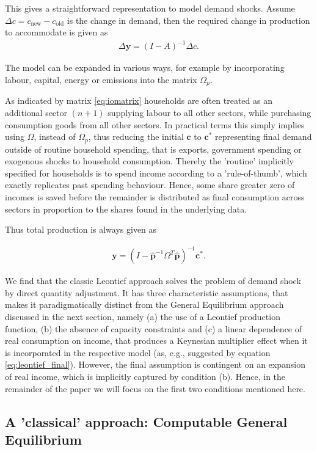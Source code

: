 \documentclass{article}
\newcommand{\hbf}[1]{\hat {\mathbf #1}}
\begin{document}
This gives a straightforward representation to model demand shocks. Assume $\Delta c = c_{\text{new}} - c_{\text{old}}$ is the change in demand, then the required change in production to accommodate is given as 
\begin{align}
   \Delta \mathbf{y} = (I - A)^{-1} \Delta c.
\end{align}

The model can be expanded in various ways, for example by incorporating labour, capital, energy or emissions into the matrix $\Omega_p$.

As indicated by matrix \eqref{eq:iomatrix} households are often treated as an additional sector $(n+1)$ supplying labour to all other sectors, while purchasing consumption goods from all other sectors. In practical terms this simply implies using $\Omega$, instead of $\Omega_p$, thus reducing the initial $\mathbf c$ to $\mathbf c^*$ representing final demand outside of routine household spending, that is exports, government spending or exogenous shocks to household consumption. Thereby the 'routine' implicitly specified for households is to spend income according to a 'rule-of-thumb', which exactly replicates past spending behaviour. Hence, some share greater zero of incomes is saved before the remainder is distributed as final consumption across sectors in proportion to the shares found in the underlying data.

Thus total production is always given as

\begin{align}\label{eq:leontief_final}
  \mathbf{y} =  (I -   \hbf{p}^{-1} \Omega^T \hbf{p})^{-1}  \mathbf c^*.
\end{align}

We find that the classic Leontief approach solves the problem of demand shock by direct quantity adjustment. It has three characteristic assumptions, that makes it paradigmatically distinct from the General Equilibrium approach discussed in the next section, namely (a) the use of a Leontief production function, (b) the absence of capacity constraints and (c) a linear dependence of real consumption on income, that produces a Keynesian multiplier effect when it is incorporated in the respective model (as, e.g., suggested by equation \eqref{eq:leontief_final}). However, the final assumption is contingent on an expansion of real income, which is implicitly captured by condition (b). Hence, in the remainder of the paper we will focus on the first two conditions mentioned here.

\subsection{A 'classical' approach: Computable General Equilibrium} \label{subsec:CGE}
\end{document}
